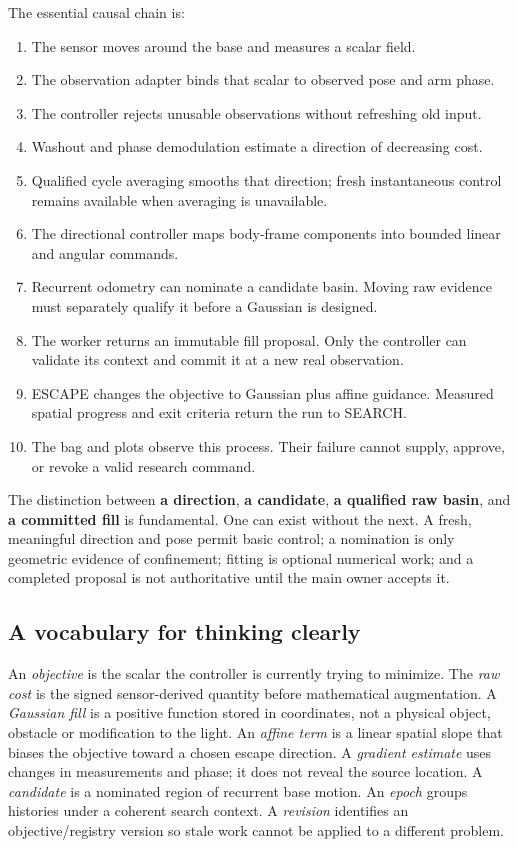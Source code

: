 \documentclass[
  10pt,
  letterpaper,
]{article}
\providecommand{\tightlist}{%
  \setlength{\itemsep}{0pt}\setlength{\parskip}{0pt}}
\begin{document}
The essential causal chain is:

\begin{enumerate}
\def\labelenumi{\arabic{enumi}.}
\tightlist
\item
  The sensor moves around the base and measures a scalar field.
\item
  The observation adapter binds that scalar to observed pose and arm
  phase.
\item
  The controller rejects unusable observations without refreshing old
  input.
\item
  Washout and phase demodulation estimate a direction of decreasing
  cost.
\item
  Qualified cycle averaging smooths that direction; fresh instantaneous
  control remains available when averaging is unavailable.
\item
  The directional controller maps body-frame components into bounded
  linear and angular commands.
\item
  Recurrent odometry can nominate a candidate basin. Moving raw evidence
  must separately qualify it before a Gaussian is designed.
\item
  The worker returns an immutable fill proposal. Only the controller can
  validate its context and commit it at a new real observation.
\item
  ESCAPE changes the objective to Gaussian plus affine guidance.
  Measured spatial progress and exit criteria return the run to SEARCH.
\item
  The bag and plots observe this process. Their failure cannot supply,
  approve, or revoke a valid research command.
\end{enumerate}

The distinction between \textbf{a direction}, \textbf{a candidate},
\textbf{a qualified raw basin}, and \textbf{a committed fill} is
fundamental. One can exist without the next. A fresh, meaningful
direction and pose permit basic control; a nomination is only geometric
evidence of confinement; fitting is optional numerical work; and a
completed proposal is not authoritative until the main owner accepts it.

\subsection{A vocabulary for thinking
clearly}\label{a-vocabulary-for-thinking-clearly}

An \emph{objective} is the scalar the controller is currently trying to
minimize. The \emph{raw cost} is the signed sensor-derived quantity
before mathematical augmentation. A \emph{Gaussian fill} is a positive
function stored in coordinates, not a physical object, obstacle or
modification to the light. An \emph{affine term} is a linear spatial
slope that biases the objective toward a chosen escape direction. A
\emph{gradient estimate} uses changes in measurements and phase; it does
not reveal the source location. A \emph{candidate} is a nominated region
of recurrent base motion. An \emph{epoch} groups histories under a
coherent search context. A \emph{revision} identifies an
objective/registry version so stale work cannot be applied to a
different problem.
\end{document}
